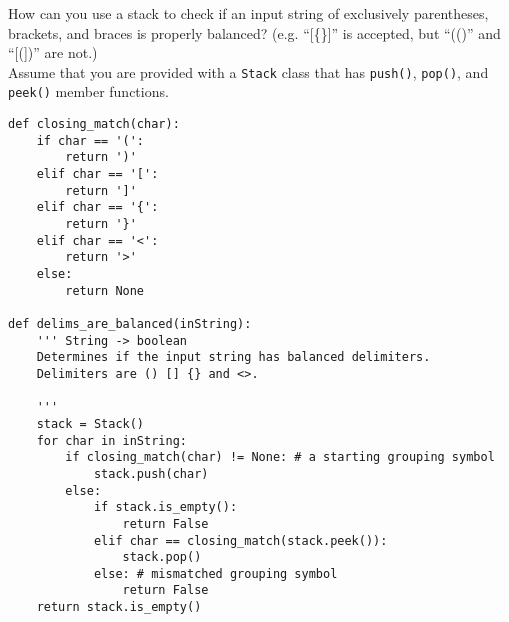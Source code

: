 How can you use a stack to check if an input string
of exclusively parentheses, brackets, and braces is properly balanced?
(e.g. ``[\{\}]'' is accepted, but ``(()'' and ``[(])'' are not.)\\
Assume that you are provided with a \texttt{Stack} class that has \texttt{push()}, \texttt{pop()}, and \texttt{peek()} member functions.

\begin{answer}
\begin{lstlisting}
def closing_match(char):
	if char == '(':
		return ')'
	elif char == '[':
		return ']'
	elif char == '{':
		return '}'
	elif char == '<':
		return '>'
	else:
		return None

def delims_are_balanced(inString):
    ''' String -> boolean
    Determines if the input string has balanced delimiters.
    Delimiters are () [] {} and <>.
    
    '''
    stack = Stack()
    for char in inString:
        if closing_match(char) != None: # a starting grouping symbol
            stack.push(char)
		else:
			if stack.is_empty():
				return False
			elif char == closing_match(stack.peek()):
				stack.pop()
			else: # mismatched grouping symbol
				return False
    return stack.is_empty()
\end{lstlisting}
\end{answer}
